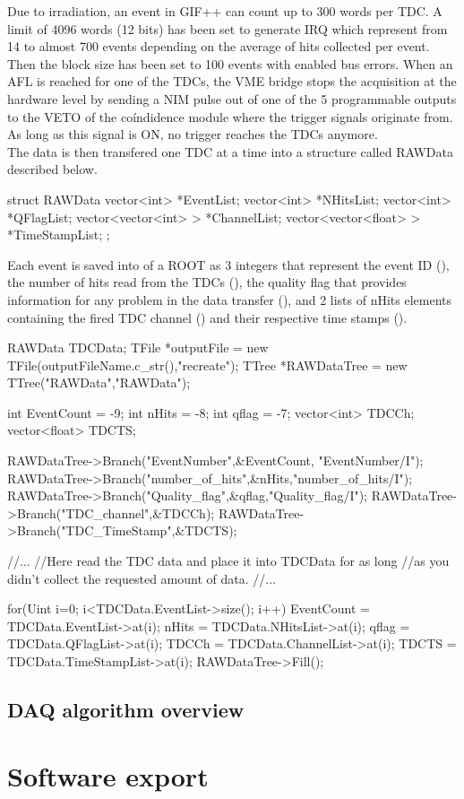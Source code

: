 	Due to irradiation, an event in GIF++ can count up to 300 words per TDC. A limit of 4096 words (12 bits) has been set to generate IRQ which represent from 14 to almost 700 events depending on the average of hits collected per event. Then the block size has been set to 100 events with enabled bus errors. When an AFL is reached for one of the TDCs, the VME bridge stops the acquisition at the hardware level by sending a NIM pulse out of one of the 5 programmable outputs to the VETO of the coíndidence module where the trigger signals originate from. As long as this signal is ON, no trigger reaches the TDCs anymore.\\
	
	The data is then transfered one TDC at a time into a structure called RAWData described below.
	
	\begin{cppcode}
struct RAWData{
    vector<int>            *EventList;
    vector<int>            *NHitsList;
    vector<int>            *QFlagList;
    vector<vector<int> >   *ChannelList;
    vector<vector<float> > *TimeStampList;
};
    \end{cppcode}
    
    Each event is saved into  of a ROOT  as 3 integers that represent the event ID (), the number of hits read from the TDCs (), the quality flag that provides information for any problem in the data transfer (), and 2 lists of nHits elements containing the fired TDC channel () and their respective time stamps ().\\
    
    \begin{cppcode}
RAWData TDCData;
TFile *outputFile = new TFile(outputFileName.c_str(),"recreate");
TTree *RAWDataTree = new TTree("RAWData","RAWData");

int           EventCount = -9;
int           nHits = -8;
int           qflag = -7;
vector<int>   TDCCh;
vector<float> TDCTS;

RAWDataTree->Branch("EventNumber",&EventCount, "EventNumber/I");
RAWDataTree->Branch("number_of_hits",&nHits,"number_of_hits/I");
RAWDataTree->Branch("Quality_flag",&qflag,"Quality_flag/I");
RAWDataTree->Branch("TDC_channel",&TDCCh);
RAWDataTree->Branch("TDC_TimeStamp",&TDCTS);

//...
//Here read the TDC data and place it into TDCData for as long
//as you didn't collect the requested amount of data.
//...
    
for(Uint i=0; i<TDCData.EventList->size(); i++){
    EventCount  = TDCData.EventList->at(i);
    nHits       = TDCData.NHitsList->at(i);
    qflag       = TDCData.QFlagList->at(i);
    TDCCh       = TDCData.ChannelList->at(i);
    TDCTS       = TDCData.TimeStampList->at(i);
    RAWDataTree->Fill();
}
    \end{cppcode}
    
    \subsection{DAQ algorithm overview}
    \label{app1:ssec:algo}
    
    

\section{Software export}


\clearpage{\pagestyle{empty}\cleardoublepage}
